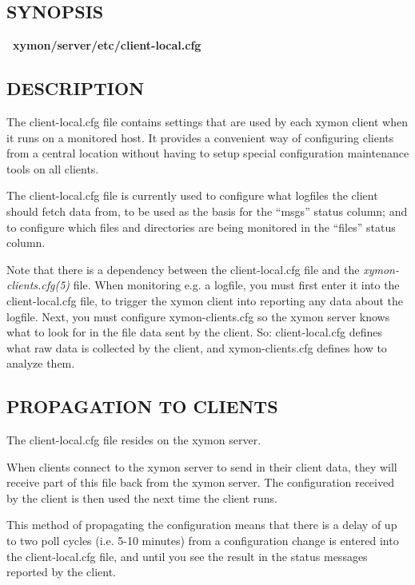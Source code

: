  
\subsection{SYNOPSIS}
\textbf{~xymon/server/etc/client-local.cfg}


 
\subsection{DESCRIPTION}
 The client-local.cfg file contains settings that are used by each
 xymon client when it runs on a monitored host. It provides a
 convenient way of configuring clients from a central location without
 having to setup special configuration maintenance tools on all
 clients. 


  The client-local.cfg file is currently used to configure what logfiles the client should fetch data from, to be used as the basis for the ``msgs'' status column; and to configure which files and directories are being monitored in the ``files'' status column. 


  Note that there is a dependency between the client-local.cfg file
  and the \emph{xymon-clients.cfg(5)} file. When monitoring e.g. a
  logfile, you must first enter it into the client-local.cfg file, to
  trigger the xymon client into reporting any data about the
  logfile. Next, you must configure xymon-clients.cfg so the xymon
  server knows what to look for in the file data sent by the
  client. So: client-local.cfg defines what raw data is collected by
  the client, and xymon-clients.cfg defines how to analyze them. 



 
\subsection{PROPAGATION TO CLIENTS}
 The client-local.cfg file resides on the xymon server. 

  When clients connect to the xymon server to send in their client
  data, they will receive part of this file back from the xymon
  server. The configuration received by the client is then used the
  next time the client runs. 



  This method of propagating the configuration means that there is a
  delay of up to two poll cycles (i.e. 5-10 minutes) from a
  configuration change is entered into the client-local.cfg file, and
  until you see the result in the status messages reported by the
  client. 



